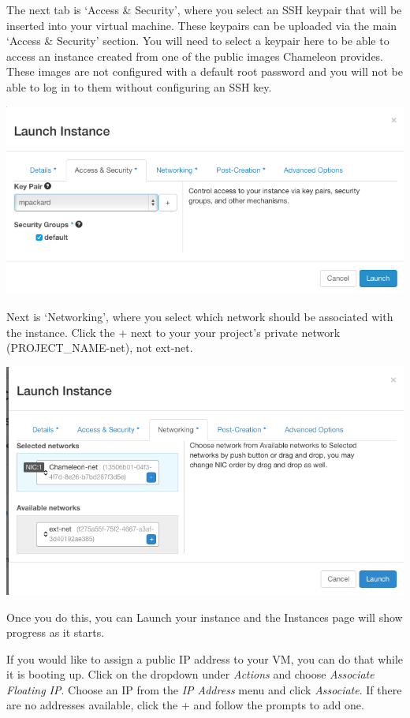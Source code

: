 The next tab is `Access \& Security', where you select an SSH keypair
that will be inserted into your virtual machine. These keypairs can be
uploaded via the main `Access \& Security' section. You will need to
select a keypair here to be able to access an instance created from one
of the public images Chameleon provides. These images are not configured
with a default root password and you will not be able to log in to them
without configuring an SSH key.

\includegraphics[width=\columnwidth]{images/chameleon/openstack_alamo_launch_access.png}

Next is `Networking', where you select which network should be
associated with the instance. Click the + next to your your project's
private network (PROJECT\_NAME-net), not ext-net.

\includegraphics[width=\columnwidth]{images/chameleon/openstack_alamo_networking.png}

Once you do this, you can Launch your instance and the Instances page
will show progress as it starts.

If you would like to assign a public IP address to your VM, you can do
that while it is booting up. Click on the dropdown under \emph{Actions}
and choose \emph{Associate Floating IP}. Choose an IP from the \emph{IP
Address} menu and click \emph{Associate}. If there are no addresses
available, click the + and follow the prompts to add one.

